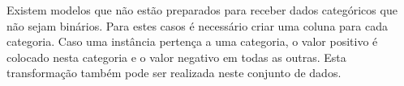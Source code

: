 Existem modelos que não estão preparados para receber dados categóricos que não sejam binários. Para estes casos é necessário criar uma coluna para cada categoria. Caso uma instância pertença a uma categoria, o valor positivo é colocado nesta categoria e o valor negativo em todas as outras. Esta transformação também pode ser realizada neste conjunto de dados. 



































